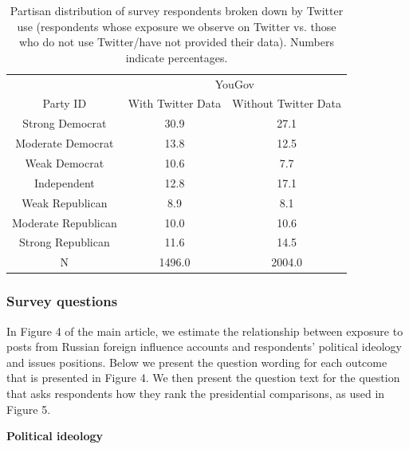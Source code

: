 \documentclass[
  12pt,
]{article}
\begin{document}
\begin{table}[!h]

\caption{\label{tab:unnamed-chunk-5}\label{tab:tab30}Partisan distribution of survey respondents broken down by Twitter use (respondents whose exposure we observe on Twitter vs. those who do not use Twitter/have not provided their data). Numbers indicate percentages.}
\centering
\fontsize{10}{12}\selectfont
\begin{tabular}[t]{c|c|c}
\hline
\multicolumn{1}{c|}{ } & \multicolumn{2}{c}{YouGov} \\
\cline{2-3}
Party ID & With Twitter Data & Without Twitter Data\\
\hline
Strong Democrat & 30.9 & 27.1\\
\hline
Moderate Democrat & 13.8 & 12.5\\
\hline
Weak Democrat & 10.6 & 7.7\\
\hline
Independent & 12.8 & 17.1\\
\hline
Weak Republican & 8.9 & 8.1\\
\hline
Moderate Republican & 10.0 & 10.6\\
\hline
Strong Republican & 11.6 & 14.5\\
\hline
\hline
N & 1496.0 & 2004.0\\
\hline
\end{tabular}
\end{table}

\clearpage

\hypertarget{survey-questions}{%
\subsubsection{Survey questions}\label{survey-questions}}

In Figure 4 of the main article, we estimate the relationship between exposure to posts from Russian foreign influence accounts and respondents' political ideology and issues positions. Below we present the question wording for each outcome that is presented in Figure 4. We then present the question text for the question that asks respondents how they rank the presidential comparisons, as used in Figure 5.\vspace{6mm}

\textbf{Political ideology}

\newline
\end{document}
